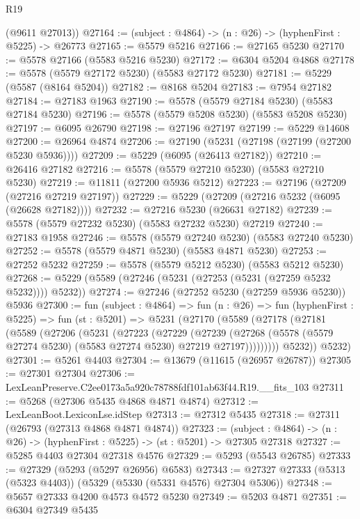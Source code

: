 \begin{lexlean}{R19}
\begin{coremodule}
      (@9611 @27013))
@27164 := (subject : @4864) -> (n : @26) -> (hyphenFirst : @5225) -> @26773
@27165 := @5579 @5216
@27166 := @27165 @5230
@27170 := @5578 @27166 (@5583 @5216 @5230)
@27172 := @6304 @5204 @4868
@27178 := @5578 (@5579 @27172 @5230) (@5583 @27172 @5230)
@27181 := @5229 (@5587 (@8164 @5204))
@27182 := @8168 @5204
@27183 := @7954 @27182
@27184 := @27183 @1963
@27190 := @5578 (@5579 @27184 @5230) (@5583 @27184 @5230)
@27196 := @5578 (@5579 @5208 @5230) (@5583 @5208 @5230)
@27197 := @6095 @26790
@27198 := @27196 @27197
@27199 := @5229 @14608
@27200 := @26964 @4874
@27206 := @27190 (@5231 (@27198 (@27199 (@27200 @5230 @5936))))
@27209 := @5229 (@6095 (@26413 @27182))
@27210 := @26416 @27182
@27216 := @5578 (@5579 @27210 @5230) (@5583 @27210 @5230)
@27219 := @11811 (@27200 @5936 @5212)
@27223 := @27196 (@27209 (@27216 @27219 @27197))
@27229 := @5229 (@27209 (@27216 @5232 (@6095 (@26628 @27182))))
@27232 := @27216 @5230 (@26631 @27182)
@27239 := @5578 (@5579 @27232 @5230) (@5583 @27232 @5230) @27219
@27240 := @27183 @1958
@27246 := @5578 (@5579 @27240 @5230) (@5583 @27240 @5230)
@27252 := @5578 (@5579 @4871 @5230) (@5583 @4871 @5230)
@27253 := @27252 @5232
@27259 := @5578 (@5579 @5212 @5230) (@5583 @5212 @5230)
@27268 := @5229 (@5589 (@27246 (@5231 (@27253 (@5231 (@27259 @5232 @5232)))) @5232))
@27274 := @27246 (@27252 @5230 (@27259 @5936 @5230)) @5936
@27300 := fun (subject : @4864) =>
  fun (n : @26) =>
  fun (hyphenFirst : @5225) =>
  fun (st : @5201) =>
  @5231
    (@27170
      (@5589
        (@27178
          (@27181
            (@5589
              (@27206
                (@5231
                  (@27223
                    (@27229
                      (@27239
                        (@27268
                          (@5578 (@5579 @27274 @5230) (@5583 @27274 @5230) @27219 @27197)))))))))
          @5232))
      @5232)
@27301 := @5261 @4403
@27304 := @13679 (@11615 (@26957 @26787))
@27305 := @27301 @27304
@27306 := LexLeanPreserve.C2ee0173a5a920c78788fdf101ab63f44.R19.__fits_103
@27311 := @5268 (@27306 @5435 @4868 @4871 @4874)
@27312 := LexLeanBoot.LexiconLse.idStep
@27313 := @27312 @5435
@27318 := @27311 (@26793 (@27313 @4868 @4871 @4874))
@27323 := (subject : @4864) -> (n : @26) -> (hyphenFirst : @5225) -> (st : @5201) -> @27305 @27318
@27327 := @5285 @4403 @27304 @27318 @4576
@27329 := @5293 (@5543 @26785)
@27333 := @27329 (@5293 (@5297 @26956) @6583)
@27343 := @27327 @27333 (@5313 (@5323 @4403)) (@5329 (@5330 (@5331 @4576) @27304 @5306))
@27348 := @5657 @27333 @4200 @4573 @4572 @5230
@27349 := @5203 @4871
@27351 := @6304 @27349 @5435

\end{coremodule}
\end{lexlean}

